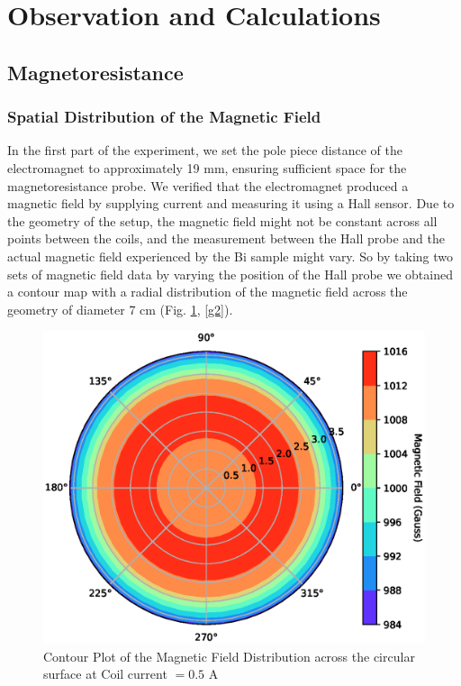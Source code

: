 \section{Observation and Calculations}

\subsection{Magnetoresistance}

\subsubsection*{Spatial Distribution of the Magnetic Field}

In the first part of the experiment, we set the pole piece distance of the electromagnet to approximately 19 mm, ensuring sufficient space for the magnetoresistance probe. We verified that the electromagnet produced a magnetic field by supplying current
and measuring it using a Hall sensor. Due to the geometry of the setup, the magnetic field might not be constant across all points between the coils, and the measurement between the Hall probe and the actual magnetic field experienced by the Bi sample might vary. So by taking two sets of magnetic field data by varying the position of the Hall probe we obtained a contour map with a radial distribution of the magnetic field across the geometry of diameter 7 cm (Fig. \ref{g1}, \ref{g2}).

\begin{figure}
    \centering
    \includegraphics[width=1\columnwidth]{images/contour0.5.eps}
    \caption{Contour Plot of the Magnetic Field Distribution across the circular surface at Coil current $= 0.5$ A}
    \label{g1}
\end{figure}

